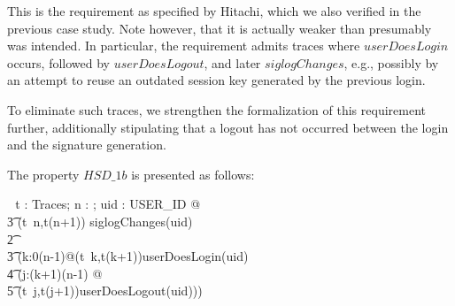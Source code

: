 \documentclass[a4paper,pdftex]{article}
\newcommand{\turnstile}{\vdash \, \,}
\newcommand{\zcomment}[1]{#1}
\begin{document}
This is the requirement as specified by Hitachi, which we also
verified in the previous case study.  Note however, that it is
actually weaker than presumably was intended.  In particular, the
requirement admits traces where $userDoesLogin$ occurs, followed by
$userDoesLogout$, and later $siglogChanges$, e.g., possibly by an
attempt to reuse an outdated session key generated by the previous
login.


To eliminate such traces, we strengthen the formalization of this
requirement further, additionally stipulating that a logout has
not occurred between the login and the signature generation.

The property $HSD\_1b$ is presented as follows:
\zcomment{
\begin{zed}
\turnstile \forall t : Traces; n : \nat; uid : USER\_ID @                          \\
\t3                           (t~n,t(n+1)) \in siglogChanges(uid)       \\
\t2                        \implies                                     \\
\t3                           (\exists k:0\upto(n-1)@(t~k,t(k+1))\in userDoesLogin(uid)\\
\t4                                            \land (\forall j:(k+1)\upto(n-1) @ \\
\t5                                  (t~j,t(j+1))\notin userDoesLogout(uid)))
\end{zed}
}

\end{document}
